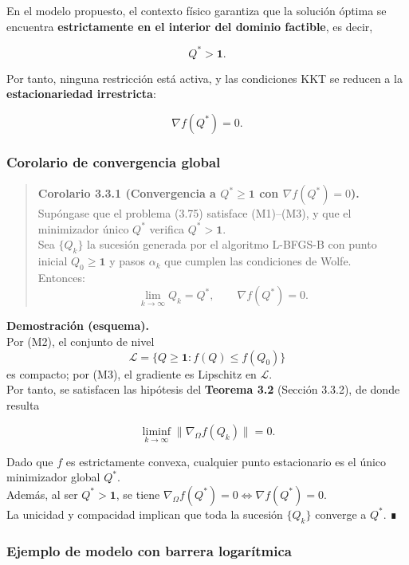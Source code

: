 \documentclass[
  spanish,
  us-letterpaper,
  DIV=11,
  numbers=noendperiod]{scrreprt}
\numberwithin{equation}{section}
\begin{document}
En el modelo propuesto, el contexto físico garantiza que la solución
óptima se encuentra \textbf{estrictamente en el interior del dominio
factible}, es decir,

\[
Q^* > \mathbf{1}. \tag{3.79}
\]

Por tanto, ninguna restricción está activa, y las condiciones KKT se
reducen a la \textbf{estacionariedad irrestricta}:

\[
\nabla f(Q^*) = 0. \tag{3.80}
\]

\subsubsection{Corolario de convergencia
global}\label{corolario-de-convergencia-global}

\begin{quote}
\textbf{Corolario 3.3.1 (Convergencia a \(Q^* \ge \mathbf{1}\) con
\(\nabla f(Q^*) = 0\)).}\\
Supóngase que el problema (3.75) satisface (M1)--(M3), y que el
minimizador único \(Q^*\) verifica \(Q^* > \mathbf{1}\).\\
Sea \(\{Q_k\}\) la sucesión generada por el algoritmo L-BFGS-B con punto
inicial \(Q_0 \ge \mathbf{1}\) y pasos \(\alpha_k\) que cumplen las
condiciones de Wolfe.\\
Entonces: \[
\lim_{k \to \infty} Q_k = Q^*, \qquad \nabla f(Q^*) = 0. \tag{3.81}
\]
\end{quote}

\textbf{Demostración (esquema).}\\
Por (M2), el conjunto de nivel\\
\[
\mathcal{L} = \{Q \ge \mathbf{1} : f(Q) \le f(Q_0)\}
\] es compacto; por (M3), el gradiente es Lipschitz en
\(\mathcal{L}\).\\
Por tanto, se satisfacen las hipótesis del \textbf{Teorema 3.2} (Sección
3.3.2), de donde resulta

\[
\liminf_{k \to \infty} \|\nabla_\Omega f(Q_k)\| = 0.
\]

Dado que \(f\) es estrictamente convexa, cualquier punto estacionario es
el único minimizador global \(Q^*\).\\
Además, al ser \(Q^* > \mathbf{1}\), se tiene
\(\nabla_\Omega f(Q^*) = 0 \iff \nabla f(Q^*) = 0\).\\
La unicidad y compacidad implican que toda la sucesión \(\{Q_k\}\)
converge a \(Q^*\). ∎

\subsubsection{Ejemplo de modelo con barrera
logarítmica}\label{ejemplo-de-modelo-con-barrera-logaruxedtmica}
\end{document}
